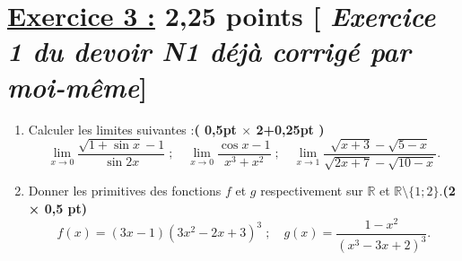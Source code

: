 \documentclass[12pt,a4paper]{article}
\begin{document}
\section*{\underline{Exercice 3 :} 2,25 points [\textit{ Exercice 1  du devoir N1 déjà  corrigé par moi-même}]}

\begin{enumerate}
    \item Calculer les limites suivantes :\hfill \textbf{( 0,5pt $\times$ 2+0,25pt )}
    \[
    \lim_{x \to 0} \frac{\sqrt{1+\sin x} - 1}{\sin 2x} \; ; \quad
    \lim_{x \to 0} \frac{\cos x - 1}{x^3 + x^2} \; ; \quad
    \lim_{x \to 1} \frac{\sqrt{x + 3} - \sqrt{5 - x}}{\sqrt{2x + 7} - \sqrt{10 - x}}.
    \]
    \item Donner les primitives des fonctions \(f\) et \(g\) respectivement sur \(\mathbb{R}\) et \(\mathbb{R} \setminus \{1; 2\}\).\hfill \textbf{(2 × 0,5 pt)}
    \[
    f(x) = (3x-1)(3x^2-2x+3)^3 \; ; \quad
    g(x) = \frac{1-x^2}{(x^3-3x+2)^3}.
    \]
\end{enumerate}
\end{document}
